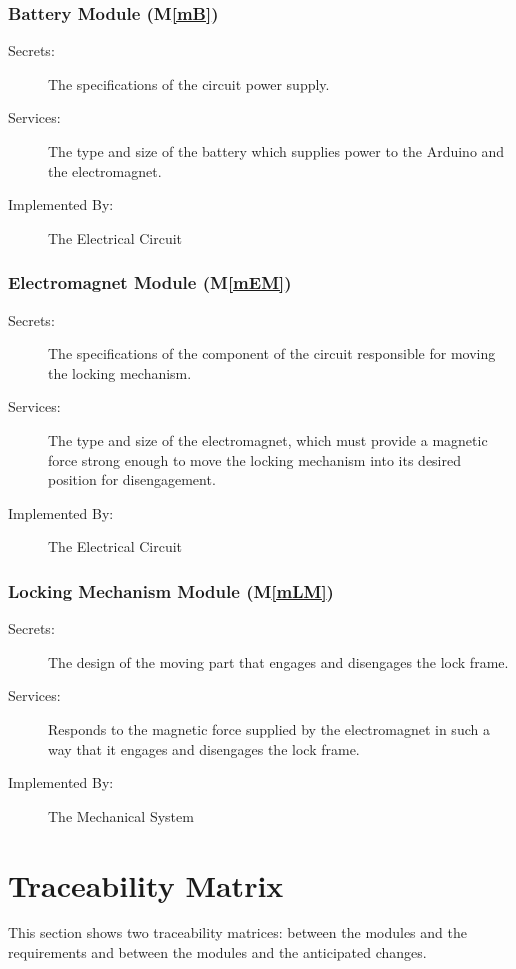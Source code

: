 \documentclass[12pt, titlepage]{article}
\newcommand{\mref}[1]{M\ref{#1}}
\begin{document}
\subsubsection{Battery Module (\mref{mB})}
\begin{description}
\item[Secrets:]The specifications of the circuit power supply.
\item[Services:]The type and size of the battery which supplies power to the Arduino and the electromagnet. 
\item[Implemented By:]The Electrical Circuit
\end{description}

\subsubsection{Electromagnet Module (\mref{mEM})}
\begin{description}
\item[Secrets:]The specifications of the component of the circuit responsible for moving the locking mechanism.
\item[Services:]The type and size of the electromagnet, which must provide a magnetic force strong enough to move the locking mechanism into its desired position for disengagement.
\item[Implemented By:]The Electrical Circuit
\end{description}

\subsubsection{Locking Mechanism Module (\mref{mLM})}
\begin{description}
\item[Secrets:]The design of the moving part that engages and disengages the lock frame.
\item[Services:]Responds to the magnetic force supplied by the electromagnet in such a way that it engages and disengages the lock frame.
\item[Implemented By:]The Mechanical System
\end{description}

\section{Traceability Matrix} \label{SecTM}

This section shows two traceability matrices: between the modules and the
requirements and between the modules and the anticipated changes.
\end{document}
